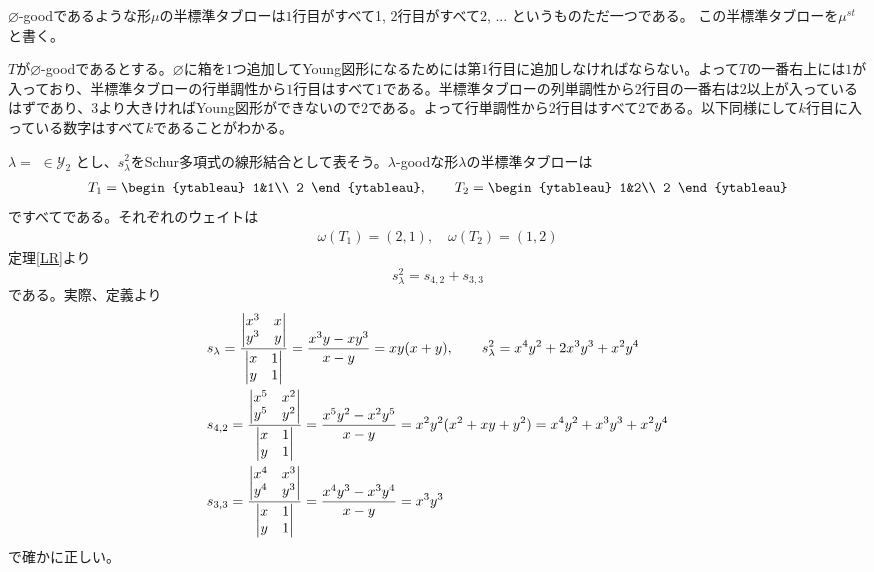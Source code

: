 \documentclass{ltjsreport}
\begin{document}
\begin{eg}\label{empty-good}
    $\varnothing$-goodであるような形$\mu$の半標準タブローは$1$行目がすべて1, $2$行目がすべて2, ... というものただ一つである。
    この半標準タブローを$\mu^{st}$と書く。

    $T$が$\varnothing$-goodであるとする。$\varnothing$に箱を$1$つ追加してYoung図形になるためには第$1$行目に追加しなければならない。よって$T$の一番右上には$1$が入っており、半標準タブローの行単調性から$1$行目はすべて$1$である。半標準タブローの列単調性から$2$行目の一番右は$2$以上が入っているはずであり、$3$より大きければYoung図形ができないので$2$である。よって行単調性から$2$行目はすべて$2$である。以下同様にして$k$行目に入っている数字はすべて$k$であることがわかる。
\end{eg}

\begin{eg}
    $\lambda=$  $\in\mathcal{Y}_2$ とし、$s_\lambda^2$をSchur多項式の線形結合として表そう。$\lambda$-goodな形$\lambda$の半標準タブローは
    \begin{align*}
        T_1=\begin{ytableau}
            1&1\\
            2
        \end{ytableau},\qquad
        T_2=\begin{ytableau}
            1&2\\
            2
        \end{ytableau}
    \end{align*}
    ですべてである。それぞれのウェイトは
    \begin{align*}
        \omega(T_1)=(2,1),\quad\omega(T_2)=(1,2)
    \end{align*}
    定理\ref{LR}より
    \[
    s_\lambda^2=s_{4,2}+s_{3,3}
    \]
    である。実際、定義より
    \begin{align*}
    &s_\lambda=\frac{\begin{vmatrix} x^3&x\\y^3&y \end{vmatrix}}{\begin{vmatrix} x&1\\y&1 \end{vmatrix}}=\frac{x^3y-xy^3}{x-y}=xy(x+y),\qquad 
    s_\lambda^2=x^4y^2+2x^3y^3+x^2y^4\\
    &s_{4,2}=\frac{\begin{vmatrix} x^5&x^2\\y^5&y^2 \end{vmatrix}}{\begin{vmatrix} x&1\\y&1 \end{vmatrix}}=\frac{x^5y^2-x^2y^5}{x-y}=x^2y^2(x^2+xy+y^2)=x^4y^2+x^3y^3+x^2y^4\\
    &s_{3,3}=\frac{\begin{vmatrix} x^4&x^3\\y^4&y^3 \end{vmatrix}}{\begin{vmatrix} x&1\\y&1 \end{vmatrix}}=\frac{x^4y^3-x^3y^4}{x-y}=x^3y^3
    \end{align*}
    で確かに正しい。

\end{eg}
\end{document}
